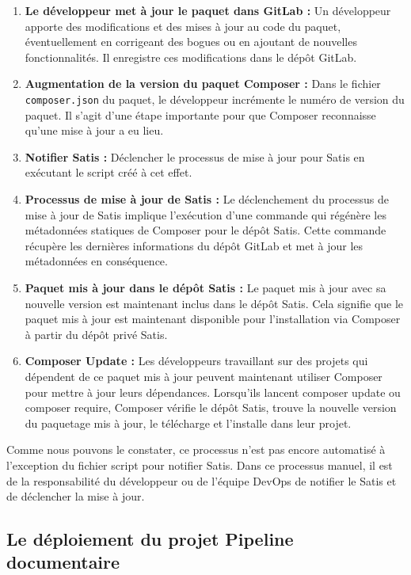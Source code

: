 \begin{enumerate}
    \item \textbf{Le développeur met à jour le paquet dans GitLab :} Un développeur apporte des modifications et des mises à jour au code du paquet, éventuellement en corrigeant des bogues ou en ajoutant de nouvelles fonctionnalités. Il enregistre ces modifications dans le dépôt GitLab.
    \item \textbf{Augmentation de la version du paquet Composer :} Dans le fichier \Verb|composer.json| du paquet, le développeur incrémente le numéro de version du paquet. Il s'agit d'une étape importante pour que Composer reconnaisse qu'une mise à jour a eu lieu.
    \item \textbf{Notifier Satis :} Déclencher le processus de mise à jour pour Satis en exécutant le script créé à cet effet.
    \item \textbf{Processus de mise à jour de Satis :} Le déclenchement du processus de mise à jour de Satis implique l'exécution d'une commande qui régénère les métadonnées statiques de Composer pour le dépôt Satis. Cette commande récupère les dernières informations du dépôt GitLab et met à jour les métadonnées en conséquence.
    \item \textbf{Paquet mis à jour dans le dépôt Satis :} Le paquet mis à jour avec sa nouvelle version est maintenant inclus dans le dépôt Satis. Cela signifie que le paquet mis à jour est maintenant disponible pour l'installation via Composer à partir du dépôt privé Satis.
    \item \textbf{Composer Update :} Les développeurs travaillant sur des projets qui dépendent de ce paquet mis à jour peuvent maintenant utiliser Composer pour mettre à jour leurs dépendances. Lorsqu'ils lancent composer update ou composer require, Composer vérifie le dépôt Satis, trouve la nouvelle version du paquetage mis à jour, le télécharge et l'installe dans leur projet.
\end{enumerate}

Comme nous pouvons le constater, ce processus n'est pas encore automatisé à l'exception du fichier script pour notifier Satis. Dans ce processus manuel, il est de la responsabilité du développeur ou de l'équipe DevOps de notifier le Satis et de déclencher la mise à jour.

\subsection{Le déploiement du projet Pipeline documentaire}

